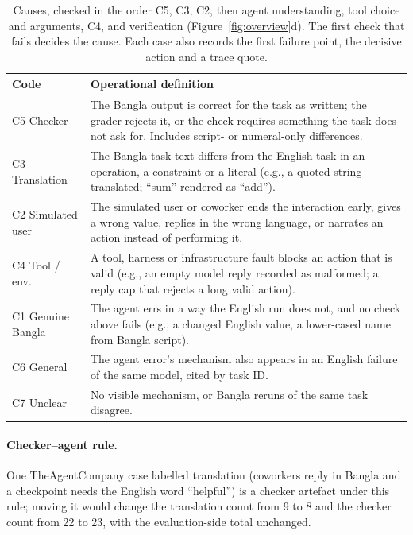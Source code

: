 \documentclass[11pt]{article}
\newcommand{\TAC}{TheAgentCompany}
\begin{document}
\begin{table}[h]
\centering\footnotesize
\begin{tabular}{L{1.5cm}L{5.25cm}}
\toprule
Code & Operational definition \\
\midrule
C5 Checker & The Bangla output is correct for the task as written; the grader rejects it, or the check
requires something the task does not ask for. Includes script- or numeral-only differences. \\
C3 Translation & The Bangla task text differs from the English task in an operation, a constraint or a
literal (e.g., a quoted string translated; ``sum'' rendered as ``add''). \\
C2 Simulated user & The simulated user or coworker ends the interaction early, gives a wrong value,
replies in the wrong language, or narrates an action instead of performing it. \\
C4 Tool / env. & A tool, harness or infrastructure fault blocks an action that is valid (e.g., an
empty model reply recorded as malformed; a reply cap that rejects a long valid action). \\
C1 Genuine Bangla & The agent errs in a way the English run does not, and no check above fails
(e.g., a changed English value, a lower-cased name from Bangla script). \\
C6 General & The agent error's mechanism also appears in an English failure of the same model, cited
by task ID. \\
C7 Unclear & No visible mechanism, or Bangla reruns of the same task disagree. \\
\bottomrule
\end{tabular}
\caption{Causes, checked in the order C5, C3, C2, then agent understanding, tool choice and
arguments, C4, and verification (Figure~\ref{fig:overview}d). The first check that fails decides
the cause. Each case also records the first failure point, the decisive action and a trace quote.}
\label{tab:codebook}
\end{table}

\paragraph{Checker--agent rule.} One \TAC{} case labelled translation (coworkers reply in Bangla and a checkpoint needs the
English word ``helpful'') is a checker artefact under this rule; moving it would change the
translation count from 9 to 8 and the checker count from 22 to 23, with the evaluation-side total
unchanged.
\end{document}
